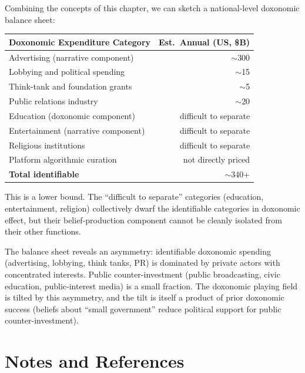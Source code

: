 Combining the concepts of this chapter, we can sketch a national-level doxonomic balance sheet:

\begin{model}
\label{mod:balance-sheet}
\begin{center}
\begin{tabular}{lr}
\toprule
\textbf{Doxonomic Expenditure Category} & \textbf{Est.\ Annual (US, \$B)} \\
\midrule
Advertising (narrative component) & $\sim$300 \\
Lobbying and political spending & $\sim$15 \\
Think-tank and foundation grants & $\sim$5 \\
Public relations industry & $\sim$20 \\
Education (doxonomic component) & difficult to separate \\
Entertainment (narrative component) & difficult to separate \\
Religious institutions & difficult to separate \\
Platform algorithmic curation & not directly priced \\
\midrule
\textbf{Total identifiable} & $\sim$340+ \\
\bottomrule
\end{tabular}
\end{center}
This is a lower bound.
The ``difficult to separate'' categories (education, entertainment, religion) collectively dwarf the identifiable categories in doxonomic effect, but their belief-production component cannot be cleanly isolated from their other functions.
\end{model}

\begin{remark}
The balance sheet reveals an asymmetry: identifiable doxonomic spending (advertising, lobbying, think tanks, PR) is dominated by private actors with concentrated interests.
Public counter-investment (public broadcasting, civic education, public-interest media) is a small fraction.
The doxonomic playing field is tilted by this asymmetry, and the tilt is itself a product of prior doxonomic success (beliefs about ``small government'' reduce political support for public counter-investment).
\end{remark}


\section{Notes and References}
\label{sec:ch10-notes}

